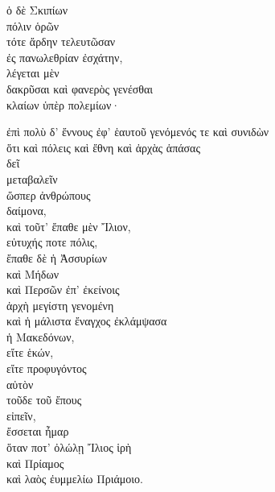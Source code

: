 {\large
\begin{greek}
\noindent  ὁ δὲ Σκιπίων \\
\tabto{2em} πόλιν ὁρῶν\\
\tabto{4em} τότε ἄρδην τελευτῶσαν \\
\tabto{6em} ἐς πανωλεθρίαν ἐσχάτην, \\
λέγεται μὲν \\
\tabto{2em} δακρῦσαι καὶ φανερὸς γενέσθαι \\
\tabto{4em} κλαίων ὑπὲρ πολεμίων·

\tabto{4em} ἐπὶ πολὺ δ' ἔννους ἐφ' ἑαυτοῦ γενόμενός τε καὶ συνιδὼν \\
\tabto{6em} ὅτι καὶ πόλεις καὶ ἔθνη καὶ ἀρχὰς ἁπάσας \\
\tabto{6em} δεῖ \\
\tabto{6em} μεταβαλεῖν \\
\tabto{8em} ὥσπερ ἀνθρώπους \\
\tabto{6em} δαίμονα, \\
\tabto{6em} καὶ τοῦτ' ἔπαθε μὲν Ἴλιον, \\
\tabto{8em} εὐτυχής ποτε πόλις, \\
\tabto{6em} ἔπαθε δὲ ἡ Ἀσσυρίων \\
\tabto{8em} καὶ Μήδων \\
\tabto{8em} καὶ Περσῶν ἐπ' ἐκείνοις \\
\tabto{6em} ἀρχὴ μεγίστη γενομένη \\
\tabto{6em} καὶ ἡ μάλιστα ἔναγχος ἐκλάμψασα \\
\tabto{8em} ἡ Μακεδόνων, \\
\tabto{4em} εἴτε ἑκών, \\
\tabto{4em} εἴτε προφυγόντος \\
\tabto{6em} αὐτὸν \\
\tabto{4em} τοῦδε τοῦ ἔπους \\
\tabto{2em} εἰπεῖν,\\
\tabto{4em} ἔσσεται ἦμαρ \\
\tabto{6em} ὅταν ποτ' ὀλώλῃ Ἴλιος ἱρὴ\\
\tabto{6em} καὶ Πρίαμος \\
\tabto{6em} καὶ λαὸς ἐυμμελίω Πριάμοιο.\\

\end{greek}
}

